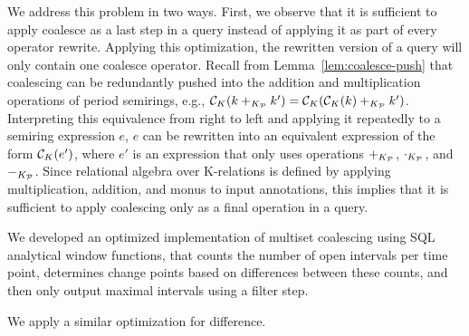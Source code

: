 We address this problem in two ways. First, we observe that it is sufficient to apply coalesce as a last step in a query instead of applying it as part of every operator rewrite. Applying this optimization, the rewritten version of a query will only contain one coalesce operator. Recall from Lemma~\ref{lem:coalesce-push} that coalescing can be redundantly pushed into the addition and multiplication operations of period semirings, e.g., $\mathcal{C}_{{K}}(k +_{K_{\mathcal{P}}} k') = \mathcal{C}_{{K}}(\mathcal{C}_{{K}}(k) +_{K_{\mathcal{P}}} k')$.
Interpreting this equivalence from right to left and applying it repeatedly to a semiring expression $e$, $e$ can be rewritten into an equivalent expression of the form $\mathcal{C}_{{K}}(e')$, where $e'$ is an expression that only uses operations $+_{K_{\mathcal{P}}}$, $\cdot_{K_{\mathcal{P}}}$, and $-_{K_{\mathcal{P}}}$. Since relational algebra over K-relations is defined by applying multiplication, addition, and monus to input annotations, this implies that it is sufficient to apply coalescing only as a final operation in a query. 


We developed an optimized implementation of multiset coalescing using SQL
analytical window functions, that counts  the
number of open intervals per time point, determines change points based on
differences between these counts, and then only output maximal intervals using
a filter step. 

 We apply a similar optimization for difference.

